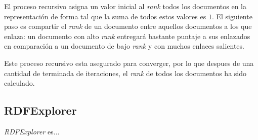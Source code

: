 El proceso recursivo asigna un valor inicial al \textit{rank} todos los
documentos en la representación de forma tal que la suma de todos estos valores
es $1$. El siguiente paso es compartir el \textit{rank} de un documento entre
aquellos documentos a los que enlaza: un documento con alto \textit{rank}
entregará bastante puntaje a sus enlazados en comparación a un documento de bajo
\textit{rank} y con muchos enlaces salientes.

Este proceso recursivo esta asegurado para converger, por lo que despues de una
cantidad de terminada de iteraciones, el \textit{rank} de todos los documentos ha
sido calculado.

\subsection{RDFExplorer}

\textit{RDFExplorer} es...

